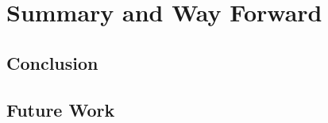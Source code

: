 \section{Summary and Way Forward}\label{sec:timeplan}
\subsection{Conclusion}\label{subsec:conclusion}
\subsection{Future Work}\label{subsec:futurework}




